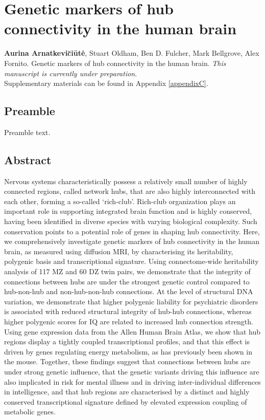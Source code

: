 \chapter{Genetic markers of hub connectivity in the human brain}
\label{ch:Chapter5}

\textbf{Aurina Arnatkevi\u{c}i\={u}t\.{e}},
Stuart Oldham,
Ben D. Fulcher,
Mark Bellgrove,
Alex Fornito.
Genetic markers of hub connectivity in the human brain. \textit{This manuscript is currently under preparation}.\\


Supplementary materials can be found in Appendix \ref{appendixC}.

\section*{Preamble}
Preamble text.

\newpage

\section*{Abstract}
Nervous systems characteristically possess a relatively small number of highly connected regions, called network hubs, that are also highly interconnected with each other, forming a so-called `rich-club’. Rich-club organization plays an important role in supporting integrated brain function and is highly conserved, having been identified in diverse species with varying biological complexity. Such conservation points to a potential role of genes in shaping hub connectivity. Here, we comprehensively investigate genetic markers of hub connectivity in the human brain, as measured using diffusion MRI, by characterising its heritability, polygenic basis and transcriptional signature. Using connectome-wide heritability analysis of 117 MZ and 60 DZ twin pairs, we demonstrate that the integrity of connections between hubs are under the strongest genetic control compared to hub-non-hub and non-hub-non-hub connections. At the level of structural DNA variation, we demonstrate that higher polygenic liability for psychiatric disorders is associated with reduced structural integrity of hub-hub connections, whereas higher polygenic scores for IQ are related to increased hub connection strength. Using gene expression data from the Allen Human Brain Atlas, we show that hub regions display a tightly coupled transcriptional profiles, and that this effect is driven by genes regulating energy metabolism, as has previously been shown in the mouse.  Together, these findings suggest that connections between hubs are under strong genetic influence, that the genetic variants driving this influence are also implicated in risk for mental illness and in driving inter-individual differences in intelligence, and that hub regions are characterised by a distinct and highly conserved transcriptional signature defined by elevated expression coupling of metabolic genes.

